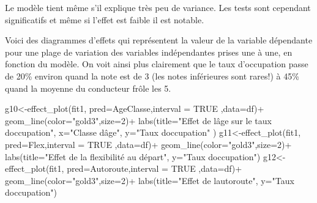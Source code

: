 \documentclass[
]{book}
\newenvironment{Shaded}{\begin{snugshade}}{\end{snugshade}}
\newcommand{\AttributeTok}[1]{\textcolor[rgb]{0.77,0.63,0.00}{#1}}
\newcommand{\ConstantTok}[1]{\textcolor[rgb]{0.00,0.00,0.00}{#1}}
\newcommand{\DecValTok}[1]{\textcolor[rgb]{0.00,0.00,0.81}{#1}}
\newcommand{\FunctionTok}[1]{\textcolor[rgb]{0.00,0.00,0.00}{#1}}
\newcommand{\NormalTok}[1]{#1}
\newcommand{\OtherTok}[1]{\textcolor[rgb]{0.56,0.35,0.01}{#1}}
\newcommand{\SpecialCharTok}[1]{\textcolor[rgb]{0.00,0.00,0.00}{#1}}
\newcommand{\StringTok}[1]{\textcolor[rgb]{0.31,0.60,0.02}{#1}}
\begin{document}
Le modèle tient même s'il explique très peu de variance. Les tests sont cependant significatifs et même si l'effet est faible il est notable.

Voici des diagrammes d'effets qui représentent la valeur de la variable dépendante pour une plage de variation des variables indépendantes prises une à une, en fonction du modèle. On voit ainsi plus clairement que le taux d'occupation passe de 20\% environ quand la note est de 3 (les notes inférieures sont rares!) à 45\% quand la moyenne du conducteur frôle les 5.

\begin{Shaded}
\begin{Highlighting}[]
\NormalTok{g10}\OtherTok{\textless{}{-}}\FunctionTok{effect\_plot}\NormalTok{(fit1, }\AttributeTok{pred=}\NormalTok{AgeClasse,}\AttributeTok{interval =} \ConstantTok{TRUE}\NormalTok{ ,}\AttributeTok{data=}\NormalTok{df)}\SpecialCharTok{+}
  \FunctionTok{geom\_line}\NormalTok{(}\AttributeTok{color=}\StringTok{"gold3"}\NormalTok{,}\AttributeTok{size=}\DecValTok{2}\NormalTok{)}\SpecialCharTok{+}
  \FunctionTok{labs}\NormalTok{(}\AttributeTok{title=}\StringTok{"Effet de l\textquotesingle{}âge sur le taux d\textquotesingle{}occupation"}\NormalTok{,}
       \AttributeTok{x=}\StringTok{"Classe d\textquotesingle{}âge"}\NormalTok{,}
       \AttributeTok{y=}\StringTok{"Taux d\textquotesingle{}occupation"}
\NormalTok{       )}
\NormalTok{g11}\OtherTok{\textless{}{-}}\FunctionTok{effect\_plot}\NormalTok{(fit1, }\AttributeTok{pred=}\NormalTok{Flex,}\AttributeTok{interval =} \ConstantTok{TRUE}\NormalTok{  ,}\AttributeTok{data=}\NormalTok{df)}\SpecialCharTok{+}
  \FunctionTok{geom\_line}\NormalTok{(}\AttributeTok{color=}\StringTok{"gold3"}\NormalTok{,}\AttributeTok{size=}\DecValTok{2}\NormalTok{)}\SpecialCharTok{+}
  \FunctionTok{labs}\NormalTok{(}\AttributeTok{title=}\StringTok{"Effet de la flexibilité au départ"}\NormalTok{,}
       \AttributeTok{y=}\StringTok{"Taux d\textquotesingle{}occupation"}\NormalTok{)}
\NormalTok{g12}\OtherTok{\textless{}{-}}\FunctionTok{effect\_plot}\NormalTok{(fit1, }\AttributeTok{pred=}\NormalTok{Autoroute,}\AttributeTok{interval =} \ConstantTok{TRUE}\NormalTok{  ,}\AttributeTok{data=}\NormalTok{df)}\SpecialCharTok{+}
  \FunctionTok{geom\_line}\NormalTok{(}\AttributeTok{color=}\StringTok{"gold3"}\NormalTok{,}\AttributeTok{size=}\DecValTok{2}\NormalTok{)}\SpecialCharTok{+}
  \FunctionTok{labs}\NormalTok{(}\AttributeTok{title=}\StringTok{"Effet de l\textquotesingle{}autoroute"}\NormalTok{,}
       \AttributeTok{y=}\StringTok{"Taux d\textquotesingle{}occupation"}\NormalTok{)}


\end{Highlighting}
\end{Shaded}
\end{document}
